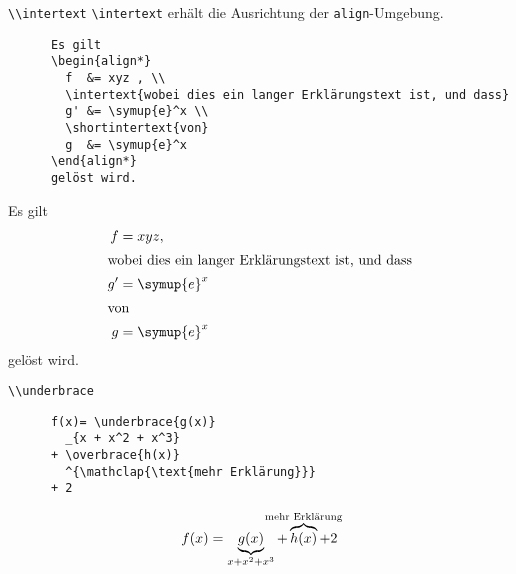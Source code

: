 \begin{frame}[fragile]{\lstinline+\\intertext+}
  \lstinline+\intertext+ erhält die Ausrichtung der \lstinline+align+-Umgebung.
  \begin{CodeExample}{0.60}
    \begin{lstlisting}
      Es gilt
      \begin{align*}
        f  &= xyz , \\
        \intertext{wobei dies ein langer Erklärungstext ist, und dass}
        g' &= \symup{e}^x \\
        \shortintertext{von}
        g  &= \symup{e}^x
      \end{align*}
      gelöst wird.
    \end{lstlisting}
  \CodeResult
    Es gilt
    \begin{align*}
      f  &= xyz , \\
      \intertext{wobei dies ein langer Erklärungstext ist, und dass}
      g' &= \symup{e}^x \\
      \shortintertext{von}
      g  &= \symup{e}^x
    \end{align*}
    gelöst wird.
  \end{CodeExample}
\end{frame}

\begin{frame}[fragile]{\lstinline+\\underbrace+}
  \begin{CodeExample}{0.58}
    \begin{lstlisting}
      f(x)= \underbrace{g(x)}
        _{x + x^2 + x^3}
      + \overbrace{h(x)}
        ^{\mathclap{\text{mehr Erklärung}}}
      + 2
    \end{lstlisting}
  \CodeResult
    \begin{equation*}
      f(x)= \underbrace{g(x)}_{x + x^2 + x^3}
      + \overbrace{h(x)}^{
        \mathclap{\text{mehr Erklärung}}
      } + 2
    \end{equation*}
  \end{CodeExample}
\end{frame}

